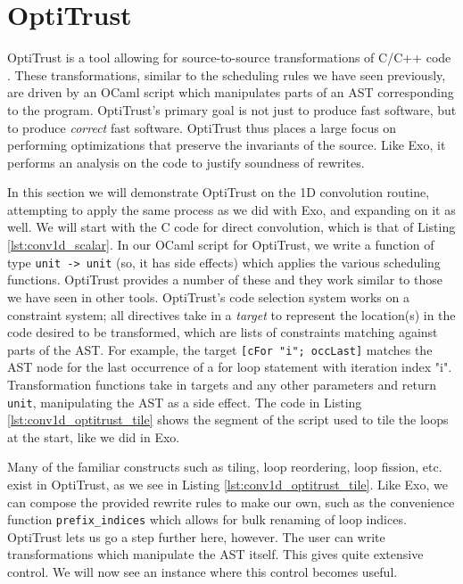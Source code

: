 \documentclass[acmsmall, nonacm=true]{acmart}
\begin{document}
\section{OptiTrust}

OptiTrust is a tool allowing for source-to-source transformations of C/C++ code \cite{chargueraud:hal-03773485}. These transformations, similar to the scheduling rules we have seen previously, are driven by an OCaml script which manipulates parts of an AST corresponding to the program. OptiTrust's primary goal is not just to produce fast software, but to produce \textit{correct} fast software. OptiTrust thus places a large focus on performing optimizations that preserve the invariants of the source. Like Exo, it performs an analysis on the code to justify soundness of rewrites.

In this section we will demonstrate OptiTrust on the 1D convolution routine, attempting to apply the same process as we did with Exo, and expanding on it as well. We will start with the C code for direct convolution, which is that of Listing \ref{lst:conv1d_scalar}. In our OCaml script for OptiTrust, we write a function of type \verb|unit -> unit| (so, it has side effects) which applies the various scheduling functions. OptiTrust provides a number of these and they work similar to those we have seen in other tools. OptiTrust's code selection system works on a constraint system; all directives take in a \textit{target} to represent the location(s) in the code desired to be transformed, which are lists of constraints matching against parts of the AST. For example, the target \verb|[cFor "i"; occLast]| matches the AST node for the last occurrence of a for loop statement with iteration index "i". Transformation functions take in targets and any other parameters and return \verb|unit|, manipulating the AST as a side effect. The code in Listing \ref{lst:conv1d_optitrust_tile} shows the segment of the script used to tile the loops at the start, like we did in Exo.

Many of the familiar constructs such as tiling, loop reordering, loop fission, etc.  exist in OptiTrust, as we see in Listing \ref{lst:conv1d_optitrust_tile}. Like Exo, we can compose the provided rewrite rules to make our own, such as the convenience function \verb|prefix_indices| which allows for bulk renaming of loop indices. OptiTrust lets us go a step further here, however. The user can write transformations which manipulate the AST itself. This gives quite extensive control. We will now see an instance where this control becomes useful.
\end{document}

